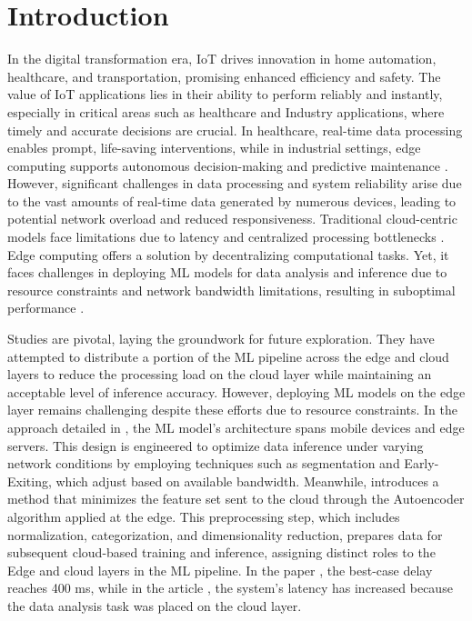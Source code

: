 \documentclass[11pt]{article}
\begin{document}
	\section{Introduction}
	\label{Introduction}
	In the digital transformation era, IoT drives innovation in home automation,
	healthcare, and transportation, promising enhanced efficiency and safety. The
	value of IoT applications lies in their ability to perform reliably and instantly,
	especially in critical areas such as healthcare and Industry applications, where
	timely and accurate decisions are crucial. In healthcare, real-time data processing
	enables prompt, life-saving interventions, while in industrial settings, edge computing supports autonomous decision-making and predictive maintenance \cite{c1}.
	However, significant challenges in data processing and system reliability arise
	due to the vast amounts of real-time data generated by numerous devices, leading
	to potential network overload and reduced responsiveness. Traditional cloud-centric models face limitations due to latency and centralized processing bottlenecks \cite{c6, c7, c8, c9, c10}. Edge computing offers a solution by decentralizing computational tasks.
	Yet, it faces challenges in deploying ML models for data analysis and inference
	due to resource constraints and network bandwidth limitations, resulting in suboptimal performance \cite{c11, c12, c13}.
	
	Studies \cite{c14, c15} are pivotal, laying the groundwork for future exploration. They
	have attempted to distribute a portion of the ML pipeline across the edge and
	cloud layers to reduce the processing load on the cloud layer while maintaining
	an acceptable level of inference accuracy. However, deploying ML models on the
	edge layer remains challenging despite these efforts due to resource constraints.
	In the approach detailed in \cite{c14}, the ML model’s architecture spans mobile
	devices and edge servers. This design is engineered to optimize data inference
	under varying network conditions by employing techniques such as segmentation and Early-Exiting, which adjust based on available bandwidth. Meanwhile,
	\cite{c15} introduces a method that minimizes the feature set sent to the cloud through
	the Autoencoder algorithm applied at the edge. This preprocessing step, which
	includes normalization, categorization, and dimensionality reduction, prepares
	data for subsequent cloud-based training and inference, assigning distinct roles
	to the Edge and cloud layers in the ML pipeline. In the paper \cite{c14}, the best-case
	delay reaches 400 ms, while in the article \cite{c15}, the system’s latency has increased
	because the data analysis task was placed on the cloud layer.
	
\end{document}
